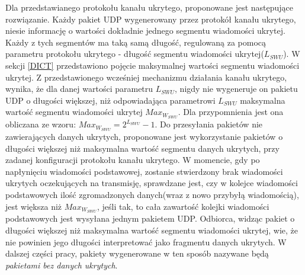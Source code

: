 \documentclass[a4paper, twoside, 12pt]{report}
\begin{document}
    Dla przedstawianego protokołu kanału ukrytego, proponowane jest następujące
    rozwiązanie. Każdy pakiet UDP wygenerowany przez protokół kanału ukrytego,
    niesie informację o wartości dokładnie jednego segmentu wiadomości ukrytej.
    Każdy z tych segmentów ma taką samą długość, regulowaną za pomocą parametru
    protokołu ukrytego - długość segmentu wiadomości ukrytej(\( L_{SWU} \)). W sekcji \ref{DICT}
    przedstawiono pojęcie maksymalnej wartości segmentu wiadomości ukrytej.
    Z przedstawionego wcześniej mechanizmu
    działania kanału ukrytego, wynika, że dla danej wartości parametru \( L_{SWU} \),
    nigdy nie wygeneruje on pakietu UDP o długości większej, niż odpowiadająca parametrowi
    \( L_{SWU} \) maksymalna wartość segmentu wiadomości ukrytej \( Max_{W_{SWU}} \).
    Dla przypomnienia jest ona obliczana ze wzoru:
    \begin{math}
        Max_{W_{SWU}} = 2^{L_{SWU}} - 1
    \end{math}.
    Do przesyłania pakietów nie zawierających danych ukrytych, proponowane jest
    wykorzystanie pakietów o długości większej niż maksymalna wartość segmentu
    danych ukrytych, przy zadanej konfiguracji protokołu kanału ukrytego. W momencie,
    gdy po napłynięciu wiadomości podstawowej, zostanie stwierdzony brak wiadomości
    ukrytych oczekujących na transmisję, sprawdzane jest, czy w kolejce wiadomości
    podstawowych ilość zgromadzonych danych(wraz z nowo przybyłą wiadomością), jest
    większa niż \( Max_{W_{SWU}} \), jeśli tak, to cała zawartość kolejki wiadomości
    podstawowych jest wysyłana jednym pakietem UDP. Odbiorca, widząc pakiet o długości
    większej niż maksymalna wartość segmentu wiadomości ukrytej, wie, że nie powinien
    jego długości interpretować jako fragmentu danych ukrytych. W dalszej części
    pracy, pakiety wygenerowane w ten sposób nazywane będą \emph{pakietami bez danych ukrytych}.
\end{document}
